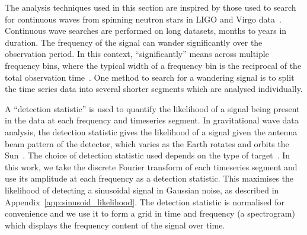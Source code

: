 \documentclass[paper-main.tex]{subfiles}
\begin{document}
The analysis techniques used in this section are inspired by those used to search for continuous waves from spinning neutron stars in LIGO and Virgo data~\cite{SuvorovaEtAl:2016,SuvorovaEtAl:2017}. 
Continuous wave searches are performed on long datasets, months to years in duration. 
The frequency of the signal can wander significantly over the observation period. 
In this context, ``significantly'' means across multiple frequency bins, where the typical width of a frequency bin is the reciprocal of the total observation time~\cite{JKS:1998,ScoX1O2Viterbi:2019}.
One method to search for a wandering signal is to split the time series data into several shorter segments which are analysed individually.%

A ``detection statistic'' is used to quantify the likelihood of a signal being present in the data at each frequency and timeseries segment. 
In gravitational wave data analysis, the detection statistic gives the likelihood of a signal given the antenna beam pattern of the detector, which varies as the Earth rotates and orbits the Sun~\cite{JKS:1998}. 
The choice of detection statistic used depends on the type of target~\cite{JKS:1998,SuvorovaEtAl:2017}.
In this work, we take the discrete Fourier transform of each timeseries segment and use its amplitude at each frequency as a detection statistic.
This maximises the likelihood of detecting a sinusoidal signal in Gaussian noise, as described in Appendix~\ref{app:sinusoid_likelihood}. 
The detection statistic is normalised for convenience and we use it to form a grid in time and frequency (a spectrogram) which displays the frequency content of the signal over time. 
\end{document}
